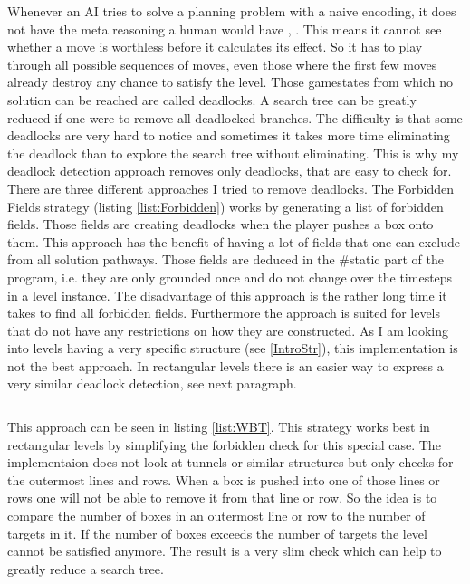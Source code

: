 \documentclass[12pt,a4paper,oneside]{report}
\begin{document}

\begin{lstlisting}[caption={Forbidden Fields},label=list:Forbidden]
\end{lstlisting}

Whenever an AI tries to solve a planning problem with a naive encoding, it does not have the meta reasoning a human would have \cite{BoteaHeuristicsVsPlanning}, \cite{SokoRelevanceCuts}. This means it cannot see whether a move is worthless before it calculates its effect. So it has to play through all possible sequences of moves, even those where the first few moves already destroy any chance to satisfy the level. Those gamestates from which no solution can be reached are called deadlocks. A search tree can be greatly reduced if one were to remove all deadlocked branches. The difficulty is that some deadlocks are very hard to notice and sometimes it takes more time eliminating the deadlock than to explore the search tree without eliminating. This is why my deadlock detection approach removes only deadlocks, that are easy to check for. There are three different approaches I tried to remove deadlocks. The Forbidden Fields strategy (listing \ref{list:Forbidden}) works by generating a list of forbidden fields. Those fields are creating deadlocks when the player pushes a box onto them. This approach has the benefit of having a lot of fields that one can exclude from all solution pathways. Those fields are deduced in the \#static part of the program, i.e. they are only grounded once and do not change over the timesteps in a level instance.
The disadvantage of this approach is the rather long time it takes to find all forbidden fields. Furthermore the approach is suited for levels that do not have any restrictions on how they are constructed. As I am looking into levels having a very specific structure (see \ref{IntroStr}), this implementation is not the best approach. In rectangular levels there is an easier way to express a very similar deadlock detection, see next paragraph.


\begin{lstlisting}[caption={Deadlock check},label=list:WBT]
\end{lstlisting}

This approach can be seen in listing \ref{list:WBT}. This strategy works best in rectangular levels by simplifying the forbidden check for this special case. The implementaion does not look at tunnels or similar structures but only checks for the outermost lines and rows. When a box is pushed into one of those lines or rows one will not be able to remove it from that line or row. So the idea is to compare the number of boxes in an outermost line or row to the number of targets in it. If the number of boxes exceeds the number of targets the level cannot be satisfied anymore. The result is a very slim check which can help to greatly reduce a search tree.
\end{document}
